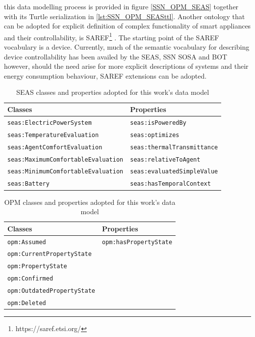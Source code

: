 \begin{enumerate}
this data modelling process is provided in figure \ref{SSN_OPM_SEAS} together with its Turtle serialization in \autoref{lst:SSN_OPM_SEASttl}. Another ontology that can be adopted for explicit definition of complex functionality of smart appliances and their controllability, is \ac{SAREF}\footnote{https://saref.etsi.org/} \citep{Daniele2015}. The starting point of the \ac{SAREF} vocabulary is a device. Currently, much of the semantic vocabulary for describing device controllability has been availed by the \ac{SEAS}, \ac{SSN} \ac{SOSA} and \ac{BOT} however, should the need arise for more explicit descriptions of systems and their energy consumption behaviour, \ac{SAREF} extensions can be adopted.  
\begin{table}[!h]
	\centering
        \caption{SEAS classes and properties adopted for this work's data model}
	\begin{tabular}{l|l}
		\hline \hline
		Classes & Properties  \bigstrut \\ \hline
		\texttt{seas:ElectricPowerSystem} & \texttt{seas:isPoweredBy}  \bigstrut \\
		\texttt{seas:TemperatureEvaluation} & \texttt{seas:optimizes}  \bigstrut \\
		\texttt{seas:AgentComfortEvaluation} & \texttt{seas:thermalTransmittance}  \bigstrut \\
		\texttt{seas:MaximumComfortableEvaluation} & \texttt{seas:relativeToAgent} \bigstrut \\
		\texttt{seas:MinimumComfortableEvaluation} & \texttt{seas:evaluatedSimpleValue} \bigstrut \\
		\texttt{seas:Battery} & \texttt{seas:hasTemporalContext} \bigstrut \\
	\end{tabular}
	\label{SEAS}
\end{table}

\begin{table}[!h]
	\centering
        \caption{OPM classes and properties adopted for this work's data model}
	\begin{tabular}{l|l}
		\hline \hline
		Classes & Properties  \bigstrut \\ \hline
		\texttt{opm:Assumed} & \texttt{opm:hasPropertyState}  \bigstrut \\
		\texttt{opm:CurrentPropertyState} & \bigstrut \\
		\texttt{opm:PropertyState} & \bigstrut \\
		\texttt{opm:Confirmed} & \bigstrut \\
		\texttt{opm:OutdatedPropertyState} & \bigstrut \\
		\texttt{opm:Deleted} & \bigstrut \\
		
	\end{tabular}
	\label{OPM}
\end{table}
\end{enumerate}

